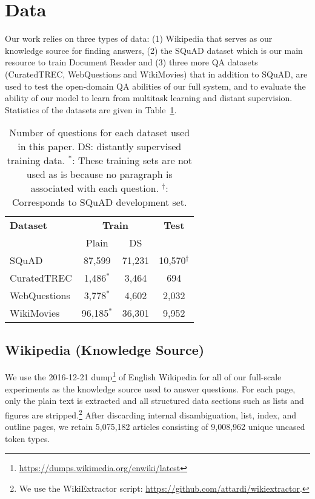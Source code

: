 \documentclass[11pt,a4paper]{article}
\newcommand\squad{SQuAD\xspace}
\newcommand\curq{CuratedTREC-S\xspace}
\newcommand\lcurq{CuratedTREC\xspace}
\newcommand\wikim{WikiMovies\xspace}
\newcommand\wq{WebQuestions\xspace}
\newcommand\usp{Document Reader\xspace}
\begin{document}
\section{Data} \label{sec:data}

Our work relies on three types of data: (1) Wikipedia that serves as our knowledge source for finding answers, (2) the SQuAD dataset which is our main resource to train \usp and (3) three more QA datasets (CuratedTREC, WebQuestions and WikiMovies)  that in addition to SQuAD, are used to test the open-domain QA abilities of our full system, and to evaluate the ability of our model to learn from multitask learning and distant supervision.
%
Statistics of the datasets are given in Table~\ref{tab:data-stats}.

\begin{table}[h]
\begin{center}
\begin{tabular}{l|c@{\,\,}c@{\,\,}c}
\hline
\bf Dataset & \multicolumn{2}{c}{\bf Train} & \bf Test  \\
& Plain & DS &  \\
\hline
\squad &  87,599 & 71,231 & 10,570$^{\dagger}$ \\
\lcurq &  1,486$^{*}$ & 3,464 & 694 \\
\wq &  3,778$^{*}$ & 4,602 & 2,032 \\
\wikim &  96,185$^{*}$ & 36,301 & 9,952 \\
\hline
\end{tabular}
\end{center}
\caption{\label{tab:data-stats} Number of questions for each dataset used in this paper. DS: distantly supervised training data.
%
$^{*}$: These training sets are not used as is because no paragraph is associated with each question.
%
$^{\dagger}$: Corresponds to SQuAD development set.}
\end{table}

\subsection{Wikipedia (Knowledge Source)}
We use the 2016-12-21 dump\footnote{\url{https://dumps.wikimedia.org/enwiki/latest}} of English Wikipedia for all of our full-scale experiments as the knowledge source used to answer questions. For each page, only the plain text is extracted and all structured data sections such as lists and figures are stripped.\footnote{We use the WikiExtractor script: \url{https://github.com/attardi/wikiextractor}.} After discarding internal disambiguation, list, index, and outline pages, we retain 5,075,182 articles consisting of 9,008,962 unique uncased token types.
\end{document}
